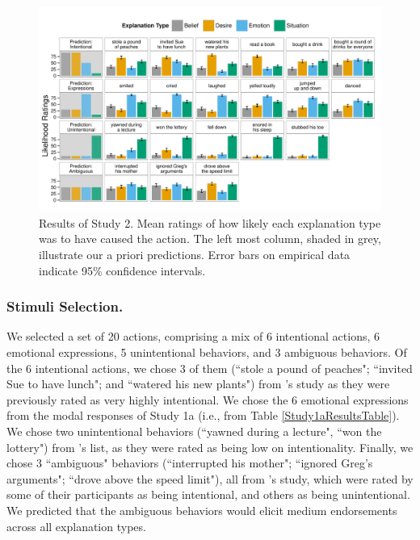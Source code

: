 \documentclass[10pt,letterpaper]{article}
\begin{document}
\begin{figure}[htb!]
\begin{center}
\includegraphics[width=1\linewidth]{images/study2Results.pdf}\end{center}
\caption{ Results of Study 2. Mean ratings of how likely each explanation type was to have caused the action. The left most column, shaded in grey, illustrate our a priori predictions. Error bars on empirical data indicate 95\% confidence intervals. }
\label{Study2ResultsFig}
\end{figure}


\subsubsection{Stimuli Selection.} We selected a set of 20 actions, comprising a mix of 6 intentional actions, 6 emotional expressions, 5 unintentional behaviors, and 3 ambiguous behaviors. Of the 6 intentional actions, we chose 3 of them (``stole a pound of peaches"; ``invited Sue to have lunch"; and ``watered his new plants") from 's study as they were previously rated as very highly intentional. We chose the 6 emotional expressions from the modal responses of Study 1a (i.e., from Table \ref{Study1aResultsTable}). We chose two unintentional behaviors (``yawned during a lecture", ``won the lottery") from 's list, as they were rated as being low on intentionality. Finally, we chose 3 ``ambiguous" behaviors (``interrupted his mother"; ``ignored Greg's arguments"; ``drove above the speed limit"), all from 's study, which were rated by some of their participants as being intentional, and others as being unintentional.
We predicted that the ambiguous behaviors would elicit medium endorsements across all explanation types.
\end{document}
